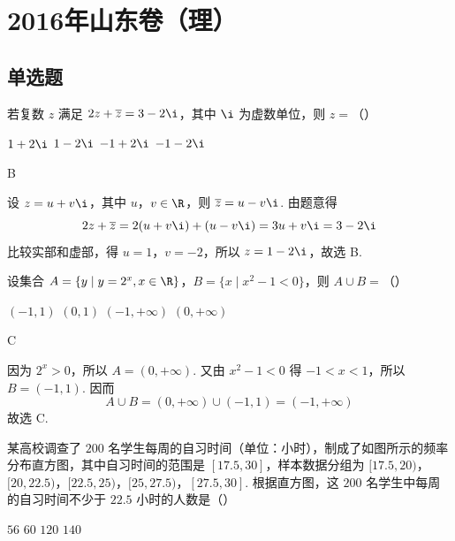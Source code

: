 
\chapter{2016年山东卷（理）}

\section{单选题}

\begin{problem}
若复数 \(z\) 满足 \(2z+\overline{z}=3-2\i\)，其中 \(\i\) 为虚数单位，则 \(z=\)（\quad）

\choices
    {\(1+2\i\)}
    {\(1-2\i\)}
    {\(-1+2\i\)}
    {\(-1-2\i\)}
\end{problem}

\begin{answer}
B
\end{answer}

\begin{solution}
设 \(z=u+v\i\)，其中 \(u\)，\(v\in\R\)，则 \(\overline{z}=u-v\i\). 由题意得
\[
2z+\overline{z}=2(u+v\i)+(u-v\i)=3u+v\i=3-2\i
\]
比较实部和虚部，得 \(u=1\)，\(v=-2\)，所以 \(z=1-2\i\)，故选 B.
\end{solution}

\begin{problem}
设集合 \(A=\{y\mid y=2^x,x\in\R\}\)，\(B=\{x\mid x^2-1<0\}\)，则 \(A\cup B=\)（\quad）

\choices
    {\((-1,1)\)}
    {\((0,1)\)}
    {\((-1,+\infty)\)}
    {\((0,+\infty)\)}
\end{problem}

\begin{answer}
C
\end{answer}

\begin{solution}
因为 \(2^x>0\)，所以 \(A=(0,+\infty)\). 又由 \(x^2-1<0\) 得 \(-1<x<1\)，所以 \(B=(-1,1)\). 因而
\[
A\cup B=(0,+\infty)\cup(-1,1)=(-1,+\infty)
\]
故选 C.
\end{solution}

\begin{problem}
某高校调查了 \(200\) 名学生每周的自习时间（单位：小时），制成了如图所示的频率分布直方图，其中自习时间的范围是 \([17.5,30]\)，样本数据分组为 \([17.5,20)\)，\([20,22.5)\)，\([22.5,25)\)，\([25,27.5)\)，\([27.5,30]\). 根据直方图，这 \(200\) 名学生中每周的自习时间不少于 \(22.5\) 小时的人数是（\quad）


\choices
    {\(56\)}
    {\(60\)}
    {\(120\)}
    {\(140\)}
\end{problem}

